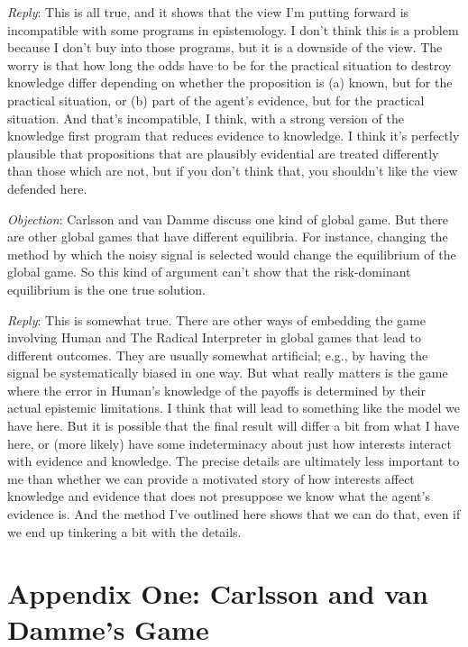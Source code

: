 \emph{Reply}: This is all true, and it shows that the view I'm putting forward is incompatible with some programs in epistemology. I don't think this is a problem because I don't buy into those programs, but it is a downside of the view. The worry is that how long the odds have to be for the practical situation to destroy knowledge differ depending on whether the proposition is (a) known, but for the practical situation, or (b) part of the agent's evidence, but for the practical situation. And that's incompatible, I think, with a strong version of the knowledge first program that reduces evidence to knowledge. I think it's perfectly plausible that propositions that are plausibly evidential are treated differently than those which are not, but if you don't think that, you shouldn't like the view defended here.

\emph{Objection}: Carlsson and van Damme discuss one kind of global game. But there are other global games that have different equilibria. For instance, changing the method by which the noisy signal is selected would change the equilibrium of the global game. So this kind of argument can't show that the risk-dominant equilibrium is the one true solution.

\emph{Reply}: This is somewhat true. There are other ways of embedding the game involving Human and The Radical Interpreter in global games that lead to different outcomes. They are usually somewhat artificial; e.g., by having the signal be systematically biased in one way. But what really matters is the game where the error in Human's knowledge of the payoffs is determined by their actual epistemic limitations. I think that will lead to something like the model we have here. But it is possible that the final result will differ a bit from what I have here, or (more likely) have some indeterminacy about just how interests interact with evidence and knowledge. The precise details are ultimately less important to me than whether we can provide a motivated story of how interests affect knowledge and evidence that does not presuppose we know what the agent's evidence is. And the method I've outlined here shows that we can do that, even if we end up tinkering a bit with the details.
 


\section{Appendix One: Carlsson and van Damme's Game}
\label{appendixone:carlssonandvandammesgame}

